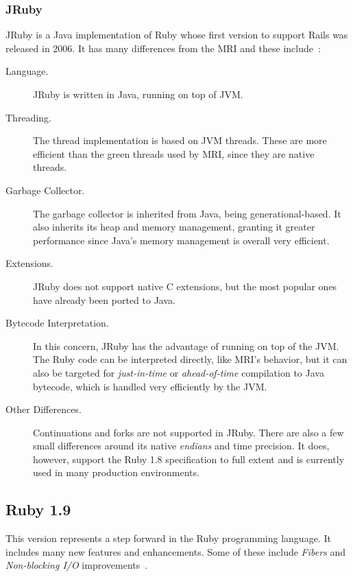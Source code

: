 \subsubsection{JRuby}
JRuby is a Java implementation of Ruby whose first version to support Rails was released in 2006. It has many differences from the MRI and these include~\cite{mri_jruby_comparison, jruby_performance_glassfish}:
\begin{description}
\item[Language.] JRuby is written in Java, running on top of JVM.
\item[Threading.] The thread implementation is based on JVM threads. These are more efficient than the green threads used by MRI, since they are native threads.
\item[Garbage Collector.]  The garbage collector is inherited from Java, being generational-based. It also inherits its heap and memory management, granting it greater performance since Java's memory management is overall very efficient.
\item[Extensions.]  JRuby does not support native C extensions, but the most popular ones have already been ported to Java.
\item[Bytecode Interpretation.] In this concern, JRuby has the advantage of running on top of the JVM. The Ruby code can be interpreted directly, like MRI's behavior, but it can also be targeted for \textit{just-in-time} or \textit{ahead-of-time} compilation to Java bytecode, which is handled very efficiently by the JVM.
\item[Other Differences.] Continuations and forks are not supported in JRuby. There are also a few small differences around its native \textit{endians} and time precision. It does, however, support the Ruby 1.8 specification to full extent and is currently used in many production environments.
\end{description}


\subsection{Ruby 1.9}
This version represents a step forward in the Ruby programming language. It includes many new features and enhancements. Some of these include \textit{Fibers} and \textit{Non-blocking I/O} improvements~\cite{changes_ruby19}.

